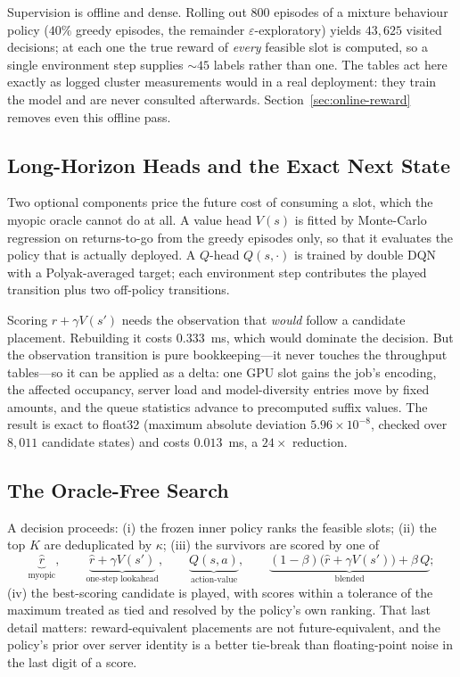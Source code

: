 \documentclass{article}
\begin{document}
Supervision is offline and dense. Rolling out $800$ episodes of a mixture
behaviour policy ($40\%$ greedy episodes, the remainder $\varepsilon$-exploratory)
yields $43{,}625$ visited decisions; at each one the true reward of \emph{every}
feasible slot is computed, so a single environment step supplies ${\sim}45$ labels
rather than one. The tables act here exactly as logged cluster measurements would
in a real deployment: they train the model and are never consulted afterwards.
Section~\ref{sec:online-reward} removes even this offline pass.

\subsection{Long-Horizon Heads and the Exact Next State}
\label{sec:heads}

Two optional components price the future cost of consuming a slot, which the
myopic oracle cannot do at all. A value head $V(s)$ is fitted by Monte-Carlo
regression on returns-to-go from the greedy episodes only, so that it evaluates
the policy that is actually deployed. A $Q$-head $Q(s,\cdot)$ is trained by double
DQN~\cite{vanhasselt2016double} with a Polyak-averaged target; each environment
step contributes the played transition plus two off-policy transitions.

Scoring $r + \gamma V(s')$ needs the observation that \emph{would} follow a
candidate placement. Rebuilding it costs $0.333$~ms, which would dominate the
decision. But the observation transition is pure bookkeeping---it never touches
the throughput tables---so it can be applied as a delta: one GPU slot gains the
job's encoding, the affected occupancy, server load and model-diversity entries
move by fixed amounts, and the queue statistics advance to precomputed suffix
values. The result is exact to float32 (maximum absolute deviation
$5.96 \times 10^{-8}$, checked over $8{,}011$ candidate states) and costs
$0.013$~ms, a $24\times$ reduction.

\subsection{The Oracle-Free Search}
\label{sec:search}

A decision proceeds: (i) the frozen inner policy ranks the feasible slots; (ii)
the top $K$ are deduplicated by $\kappa$; (iii) the survivors are scored by one of
\[
\underbrace{\hat r}_{\text{myopic}},\qquad
\underbrace{\hat r + \gamma V(s')}_{\text{one-step lookahead}},\qquad
\underbrace{Q(s,a)}_{\text{action-value}},\qquad
\underbrace{(1-\beta)\bigl(\hat r + \gamma V(s')\bigr) + \beta\,Q}_{\text{blended}};
\]
(iv) the best-scoring candidate is played, with scores within a tolerance of the
maximum treated as tied and resolved by the policy's own ranking. That last detail
matters: reward-equivalent placements are not future-equivalent, and the policy's
prior over server identity is a better tie-break than floating-point noise in the
last digit of a score.
\end{document}
